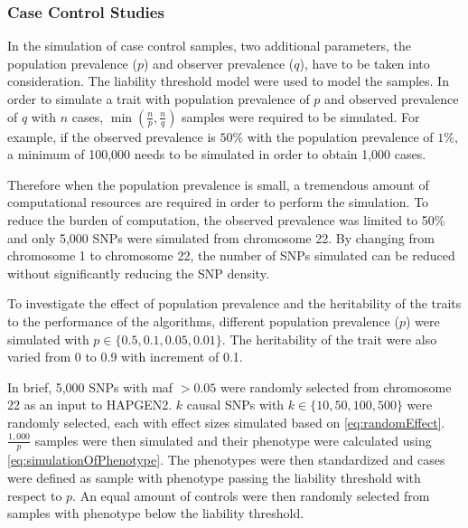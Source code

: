 		\subsubsection{Case Control Studies}
		In the simulation of case control samples, two additional parameters, the population prevalence ($p$) and observer prevalence ($q$), have to be taken into consideration. 
		The liability threshold model were used to model the samples.
		In order to simulate a trait with population prevalence of $p$ and observed prevalence of $q$ with $n$ cases, $\min(\frac{n}{p}, \frac{n}{q})$ samples were required to be simulated. 
		For example, if the observed prevalence is $50\%$ with the population prevalence of $1\%$, a minimum of 100,000 needs to be simulated in order to obtain 1,000 cases.
		
		Therefore when the population prevalence is small, a tremendous amount of computational resources are required in order to perform the simulation.
		To reduce the burden of computation, the observed prevalence was limited to 50\% and only 5,000 \glspl{SNP} were simulated from chromosome 22.
		By changing from chromosome 1 to chromosome 22, the number of \glspl{SNP} simulated can be reduced without significantly reducing the \gls{SNP} density.
		
		To investigate the effect of population prevalence and the heritability of the traits to the performance of the algorithms, different population prevalence ($p$) were simulated with $p\in\{0.5, 0.1, 0.05, 0.01\}$.
		The heritability of the trait were also varied from 0 to 0.9 with increment of 0.1.

		In brief, 5,000 \glspl{SNP} with \gls{maf} $>0.05$ were randomly selected from chromosome 22 as an input to HAPGEN2. 
		$k$ causal \glspl{SNP} with $k\in\{10,50,100,500\}$ were randomly selected, each with effect sizes simulated based on \cref{eq:randomEffect}.
		$\frac{1,000}{p}$ samples were then simulated and their phenotype were calculated using \cref{eq:simulationOfPhenotype}.
		The phenotypes were then standardized and cases were defined as sample with phenotype passing the liability threshold with respect to $p$.
		An equal amount of controls were then randomly selected from samples with phenotype below the liability threshold.
			
